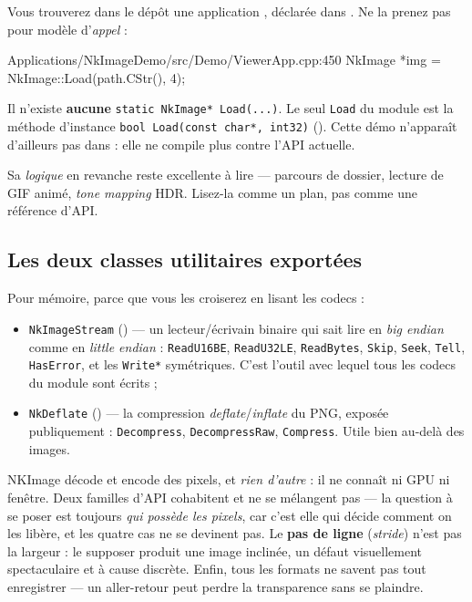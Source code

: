 \begin{nkpiege}
Vous trouverez dans le dépôt une application ,
déclarée dans . Ne la prenez pas pour modèle
d'\emph{appel} :

\begin{nkcode}{Applications/NkImageDemo/src/Demo/ViewerApp.cpp:450}
            NkImage *img = NkImage::Load(path.CStr(), 4);
\end{nkcode}

Il n'existe \textbf{aucune} \texttt{static NkImage* Load(...)}. Le seul
\texttt{Load} du module est la méthode d'instance \texttt{bool Load(const char*,
int32)} (). Cette démo n'apparaît d'ailleurs pas dans
 : elle ne compile plus contre l'API actuelle.

Sa \emph{logique} en revanche reste excellente à lire — parcours de dossier,
lecture de GIF animé, \emph{tone mapping} HDR. Lisez-la comme un plan, pas comme
une référence d'API.
\end{nkpiege}

\subsection{Les deux classes utilitaires exportées}

Pour mémoire, parce que vous les croiserez en lisant les codecs :

\begin{itemize}
  \item \texttt{NkImageStream} () — un
        lecteur/écrivain binaire qui sait lire en \emph{big endian} comme en
        \emph{little endian} : \texttt{ReadU16BE}, \texttt{ReadU32LE},
        \texttt{ReadBytes}, \texttt{Skip}, \texttt{Seek}, \texttt{Tell},
        \texttt{HasError}, et les \texttt{Write*} symétriques. C'est l'outil
        avec lequel tous les codecs du module sont écrits ;
  \item \texttt{NkDeflate} () — la compression
        \emph{deflate}/\emph{inflate} du PNG, exposée publiquement :
        \texttt{Decompress}, \texttt{DecompressRaw}, \texttt{Compress}. Utile
        bien au-delà des images.
\end{itemize}

\begin{nkbilan}
NKImage décode et encode des pixels, et \emph{rien d'autre} : il ne connaît ni
GPU ni fenêtre. Deux familles d'API cohabitent et ne se mélangent pas --- la
question à se poser est toujours \emph{qui possède les pixels}, car c'est elle
qui décide comment on les libère, et les quatre cas ne se devinent pas. Le
\textbf{pas de ligne} (\emph{stride}) n'est pas la largeur : le supposer produit
une image inclinée, un défaut visuellement spectaculaire et à cause discrète.
Enfin, tous les formats ne savent pas tout enregistrer --- un aller-retour peut
perdre la transparence sans se plaindre.
\end{nkbilan}

